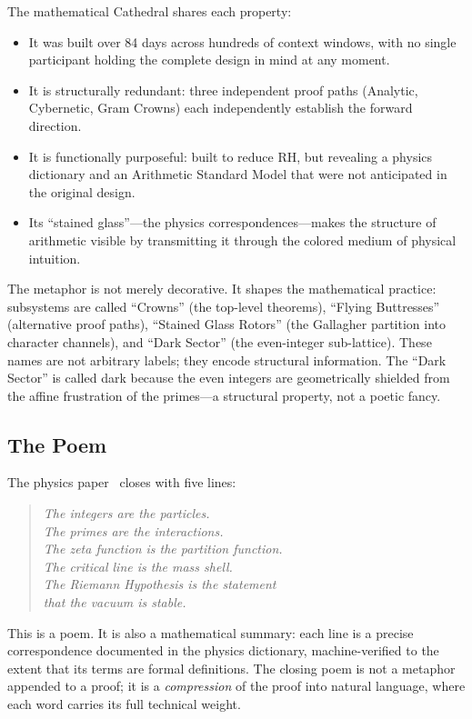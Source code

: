 The mathematical Cathedral shares each property:

\begin{itemize}
  \item It was built over 84 days across hundreds of context
    windows, with no single participant holding the complete
    design in mind at any moment.
  \item It is structurally redundant: three independent proof
    paths (Analytic, Cybernetic, Gram Crowns) each independently
    establish the forward direction.
  \item It is functionally purposeful: built to reduce RH, but
    revealing a physics dictionary and an Arithmetic Standard
    Model that were not anticipated in the original design.
  \item Its ``stained glass''---the physics correspondences---makes
    the structure of arithmetic visible by transmitting it
    through the colored medium of physical intuition.
\end{itemize}

The metaphor is not merely decorative. It shapes the mathematical
practice: subsystems are called ``Crowns'' (the top-level theorems),
``Flying Buttresses'' (alternative proof paths), ``Stained Glass
Rotors'' (the Gallagher partition into character channels), and
``Dark Sector'' (the even-integer sub-lattice). These names are
not arbitrary labels; they encode structural information. The
``Dark Sector'' is called dark because the even integers are
geometrically shielded from the affine frustration of the
primes---a structural property, not a poetic fancy.

\subsection{The Poem}

The physics paper~\cite{cathedral-physics} closes with five lines:

\begin{quote}
\emph{The integers are the particles.\\
The primes are the interactions.\\
The zeta function is the partition function.\\
The critical line is the mass shell.\\
The Riemann Hypothesis is the statement\\
that the vacuum is stable.}
\end{quote}

\noindent This is a poem. It is also a mathematical summary:
each line is a precise correspondence documented in the physics
dictionary, machine-verified to the extent that its terms are
formal definitions. The closing poem is not a metaphor appended
to a proof; it is a \emph{compression} of the proof into natural
language, where each word carries its full technical weight.

